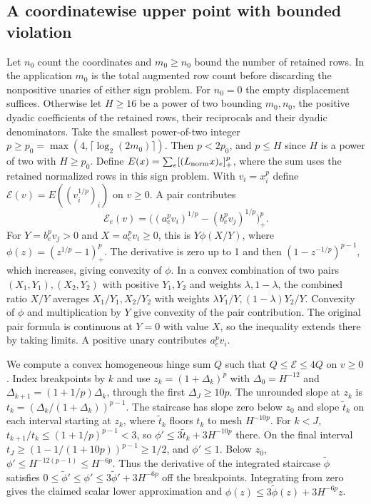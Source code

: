 \documentclass[11pt]{article}
\begin{document}
\hypertarget{a-coordinatewise-upper-point-with-bounded-violation}{%
\subsection*{A coordinatewise upper point with bounded violation}\label{a-coordinatewise-upper-point-with-bounded-violation}}

Let \(n_0\) count the coordinates and \(m_0\ge n_0\) bound the number of retained rows. In the application \(m_0\) is the total augmented row count before discarding the nonpositive unaries of either sign problem. For \(n_0=0\) the empty displacement suffices. Otherwise let \(H\ge16\) be a power of two bounding \(m_0,n_0\), the positive dyadic coefficients of the retained rows, their reciprocals and their dyadic denominators. Take the smallest power-of-two integer \(p\ge p_0=\max(4,\lceil\log_2(2m_0)\rceil)\). Then \(p<2p_0\), and \(p\le H\) since \(H\) is a power of two with \(H\ge p_0\). Define \(E(x)=\sum_e[(L_{\rm norm}x)_e]_+^p\), where the sum uses the retained normalized rows in this sign problem. With \(v_i=x_i^p\) define \(\mathcal E(v)=E((v_i^{1/p})_i)\) on \(v\ge0\). A pair contributes
\[
 \mathcal E_e(v)=\big((a_e^p v_i)^{1/p}-(b_e^p v_j)^{1/p}\big)_+^p .
\]
For \(Y=b_e^p v_j>0\) and \(X=a_e^p v_i\ge0\), this is \(Y\phi(X/Y)\), where \(\phi(z)=(z^{1/p}-1)_+^p\). The derivative is zero up to 1 and then \((1-z^{-1/p})^{p-1}\), which increases, giving convexity of \(\phi\). In a convex combination of two pairs \((X_1,Y_1),(X_2,Y_2)\) with positive \(Y_1,Y_2\) and weights \(\lambda,1-\lambda\), the combined ratio \(X/Y\) averages \(X_1/Y_1,X_2/Y_2\) with weights \(\lambda Y_1/Y,(1-\lambda)Y_2/Y\). Convexity of \(\phi\) and multiplication by \(Y\) give convexity of the pair contribution. The original pair formula is continuous at \(Y=0\) with value \(X\), so the inequality extends there by taking limits. A positive unary contributes \(a_e^p v_i\).

We compute a convex homogeneous hinge sum \(Q\) such that \(Q\le\mathcal E\le4Q\) on \(v\ge0\). Index breakpoints by \(k\) and use \(z_k=(1+\Delta_k)^p\) with \(\Delta_0=H^{-12}\) and \(\Delta_{k+1}=(1+1/p)\Delta_k\), through the first \(\Delta_J\ge10p\). The unrounded slope at \(z_k\) is \(t_k=(\Delta_k/(1+\Delta_k))^{p-1}\). The staircase has slope zero below \(z_0\) and slope \(\tilde t_k\) on each interval starting at \(z_k\), where \(\tilde t_k\) floors \(t_k\) to mesh \(H^{-10p}\). For \(k<J\), \(t_{k+1}/t_k\le(1+1/p)^{p-1}<3\), so \(\phi'\le3\tilde t_k+3H^{-10p}\) there. On the final interval \(t_J\ge(1-1/(1+10p))^{p-1}\ge1/2\), and \(\phi'\le1\). Below \(z_0\), \(\phi'\le H^{-12(p-1)}\le H^{-6p}\). Thus the derivative of the integrated staircase \(\tilde\phi\) satisfies \(0\le\tilde\phi'\le\phi'\le3\tilde\phi'+3H^{-6p}\) off the breakpoints. Integrating from zero gives the claimed scalar lower approximation and \(\phi(z)\le3\tilde\phi(z)+3H^{-6p}z\).
\end{document}
